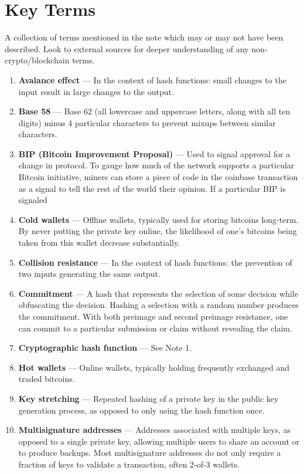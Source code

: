 \documentclass[full.tex]{subfiles}
\begin{document}
    \section*{Key Terms}
    \noindent A collection of terms mentioned in the note which may or may not have been described. Look to external sources for deeper understanding of any non-crypto/blockchain terms.
    \begin{enumerate}
        \item \textbf{Avalance effect} --- In the context of hash functions: small changes to the input result in large changes to the output.
        \item \textbf{Base 58} --- Base 62 (all lowercase and uppercase letters, along with all ten digits) minus 4 particular characters to prevent mixups between similar characters.
        \item \textbf{BIP (Bitcoin Improvement Proposal)} --- Used to signal approval for a change in protocol. To gauge how much of the network supports a particular Bitcoin initiative, miners can store a piece of code in the coinbase transaction as a signal to tell the rest of the world their opinion. If a particular BIP is signaled 
        \item \textbf{Cold wallets} --- Offline wallets, typically used for storing bitcoins long-term. By never putting the private key online, the likelihood of one's bitcoins being taken from this wallet decrease substantially.
        \item \textbf{Collision resistance} --- In the context of hash functions: the prevention of two inputs generating the same output.
        \item \textbf{Commitment} --- A hash that represents the selection of some decision while obfuscating the decision. Hashing a selection with a random number produces the commitment. With both preimage and second preimage resistance, one can commit to a particular submission or claim without revealing the claim.
        \item \textbf{Cryptographic hash function} --- See Note 1.
        \item \textbf{Hot wallets} --- Online wallets, typically holding frequently exchanged and traded bitcoins. 
        \item \textbf{Key stretching} --- Repeated hashing of a private key in the public key generation process, as opposed to only using the hash function once.
        \item \textbf{Multisignature addresses} --- Addresses associated with multiple keys, as opposed to a single private key, allowing multiple users to share an account or to produce backups. Most multisignature addresses do not only require a fraction of keys to validate a transaction, often 2-of-3 wallets.

\end{enumerate}
\end{document}

